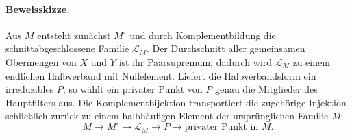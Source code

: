 \documentclass[main.tex]{subfiles}
\begin{document}

\paragraph{Beweisskizze.}
Aus \(M\) entsteht zunächst \(M^\circ\) und durch Komplementbildung die
schnittabgeschlossene Familie \(\mathcal L_M\). Der Durchschnitt aller
gemeinsamen Obermengen von \(X\) und \(Y\) ist ihr Paarsupremum; dadurch wird
\(\mathcal L_M\) zu einem endlichen Halbverband mit Nullelement. Liefert die
Halbverbandsform ein irreduzibles \(P\), so wählt ein privater Punkt von \(P\)
genau die Mitglieder des Hauptfilters aus. Die Komplementbijektion
transportiert die zugehörige Injektion schließlich zurück zu einem
halbhäufigen Element der ursprünglichen Familie \(M\):
\[
  M\longrightarrow M^\circ\longrightarrow\mathcal L_M
  \longrightarrow P\longrightarrow\text{privater Punkt in }M.
\]
\end{document}
